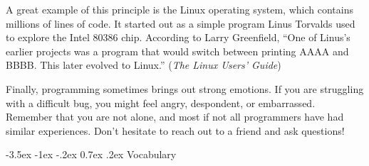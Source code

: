 \documentclass[12pt]{book}
\makeatletter
\renewcommand{\section}{\@startsection {section}{1}{\z@}%
    {-3.5ex \@plus -1ex \@minus -.2ex}%
    {0.7ex \@plus.2ex}%
    {\normalfont\Large\bfseries}}
\theoremstyle{exercise}
\makeatother
\begin{document}

A great example of this principle is the Linux operating system, which contains millions of lines of code.
It started out as a simple program Linus Torvalds used to explore the Intel 80386 chip.
According to Larry Greenfield, ``One of Linus's earlier projects was a program that would switch between printing AAAA and BBBB.
This later evolved to Linux.'' ({\em The Linux Users' Guide})


Finally, programming sometimes brings out strong emotions.
If you are struggling with a difficult bug, you might feel angry, despondent, or embarrassed.
Remember that you are not alone, and most if not all programmers have had similar experiences.
Don't hesitate to reach out to a friend and ask questions!







\section{Vocabulary}
\end{document}
